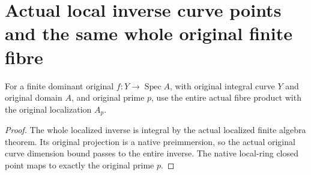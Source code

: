 \section{Actual local inverse curve points and the same whole original finite fibre}

\begin{definition}
\label{def:fc-at-prime-inverse-curve}
\leanok
{}
For a finite dominant original $f:Y\to\operatorname{Spec}A$, with original
integral curve $Y$ and original domain $A$, and original prime $p$, use the
entire actual fibre product with the original localization $A_p$.
\end{definition}
\begin{proof}
The whole localized inverse is integral by the actual localized finite
algebra theorem.  Its original projection is a native preimmersion, so the
actual original curve dimension bound passes to the entire inverse.  The
native local-ring closed point maps to exactly the original prime $p$.
\end{proof}

